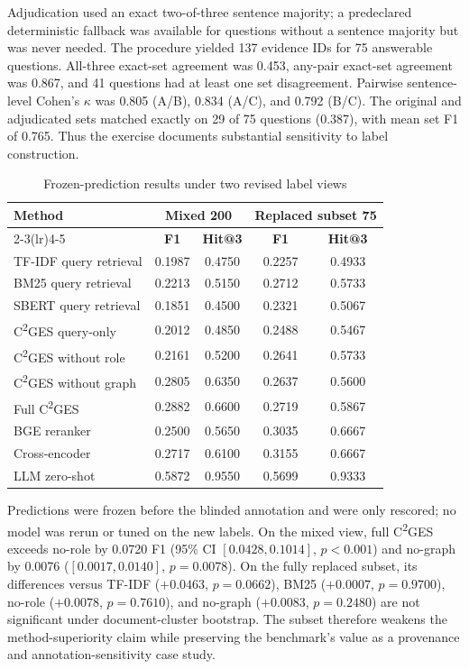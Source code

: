 \documentclass[11pt,letterpaper]{article}
\newcommand{\cges}{C\textsuperscript{2}GES}
\begin{document}
Adjudication used an exact two-of-three sentence majority; a predeclared deterministic fallback was available for questions without a sentence majority but was never needed. The procedure yielded 137 evidence IDs for 75 answerable questions. All-three exact-set agreement was 0.453, any-pair exact-set agreement was 0.867, and 41 questions had at least one set disagreement. Pairwise sentence-level Cohen's $\kappa$ was 0.805 (A/B), 0.834 (A/C), and 0.792 (B/C). The original and adjudicated sets matched exactly on 29 of 75 questions (0.387), with mean set F1 of 0.765. Thus the exercise documents substantial sensitivity to label construction.

\begin{table}[ht]
\centering
\small
\caption{Frozen-prediction results under two revised label views}
\label{tab:s8_views}
\begin{tabular}{lcccc}
\toprule
\textbf{Method} & \multicolumn{2}{c}{\textbf{Mixed 200}} & \multicolumn{2}{c}{\textbf{Replaced subset 75}} \\
\cmidrule(lr){2-3}\cmidrule(lr){4-5}
 & \textbf{F1} & \textbf{Hit@3} & \textbf{F1} & \textbf{Hit@3} \\
\midrule
TF-IDF query retrieval & 0.1987 & 0.4750 & 0.2257 & 0.4933 \\
BM25 query retrieval & 0.2213 & 0.5150 & 0.2712 & 0.5733 \\
SBERT query retrieval & 0.1851 & 0.4500 & 0.2321 & 0.5067 \\
\cges{} query-only & 0.2012 & 0.4850 & 0.2488 & 0.5467 \\
\cges{} without role & 0.2161 & 0.5200 & 0.2641 & 0.5733 \\
\cges{} without graph & 0.2805 & 0.6350 & 0.2637 & 0.5600 \\
Full \cges{} & 0.2882 & 0.6600 & 0.2719 & 0.5867 \\
BGE reranker & 0.2500 & 0.5650 & 0.3035 & 0.6667 \\
Cross-encoder & 0.2717 & 0.6100 & 0.3155 & 0.6667 \\
LLM zero-shot & 0.5872 & 0.9550 & 0.5699 & 0.9333 \\
\bottomrule
\end{tabular}
\end{table}

Predictions were frozen before the blinded annotation and were only rescored; no model was rerun or tuned on the new labels. On the mixed view, full \cges{} exceeds no-role by 0.0720 F1 (95\% CI $[0.0428,0.1014]$, $p<0.001$) and no-graph by 0.0076 ($[0.0017,0.0140]$, $p=0.0078$). On the fully replaced subset, its differences versus TF-IDF ($+0.0463$, $p=0.0662$), BM25 ($+0.0007$, $p=0.9700$), no-role ($+0.0078$, $p=0.7610$), and no-graph ($+0.0083$, $p=0.2480$) are not significant under document-cluster bootstrap. The subset therefore weakens the method-superiority claim while preserving the benchmark's value as a provenance and annotation-sensitivity case study.
\end{document}
